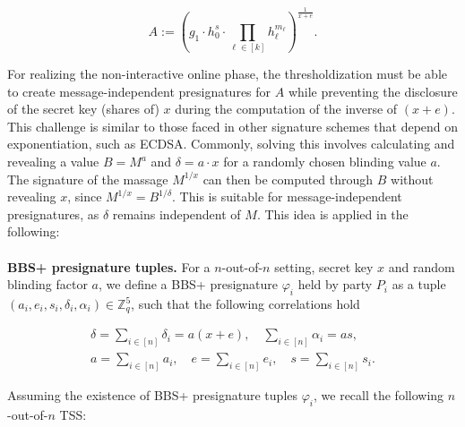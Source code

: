 \begin{equation}
A := \left( g_1\cdot h_0^s\cdot \prod_{\ell \in [k]} h_{\ell}^{m_{\ell}} \right)^{\frac{1}{x+e}}.
\label{eq:BBS+standardA}
\end{equation}

For realizing the non-interactive online phase, the thresholdization must be able to create message-independent presignatures for $A$ while preventing the disclosure of the secret key (shares of) $x$ during the computation of the inverse of $(x+e)$. This challenge is similar to those faced in other signature schemes that depend on exponentiation, such as ECDSA. Commonly, solving this involves calculating and revealing a value $B = M^a$ and $\delta = a\cdot x$ for a randomly chosen blinding value $a$. The signature of the massage $M^{1/x}$ can then be computed through $B$ without revealing $x$, since $M^{1/x} = B^{1/\delta}$. This is suitable for message-independent presignatures, as $\delta$ remains independent of $M$. This idea is applied in the following:
\\\\
\textbf{BBS+ presignature tuples.} For a $n$-out-of-$n$ setting, secret key $x$ and random blinding factor $a$, we define a BBS+ presignature $\varphi_i$ held by party $P_i$ as a tuple $(a_i,e_i,s_i,\delta_i,\alpha_i) \in \mathbb{Z}^5_q$, such that the following correlations hold

\begin{equation}
\begin{array}{l}
\delta=\sum\limits_{i \in[n]} \delta_i=a(x+e), \quad
\sum\limits_{i \in[n]} \alpha_i=as, \\
a=\sum\limits_{i \in[n]} a_i, \quad e=\sum\limits_{i \in[n]} e_i, \quad s=\sum\limits_{i \in[n]} s_i.
\end{array}
\label{eq:req_correlations}
\end{equation}

Assuming the existence of BBS+ presignature tuples $\varphi_i$, we recall the following $n$-out-of-$n$ TSS:

